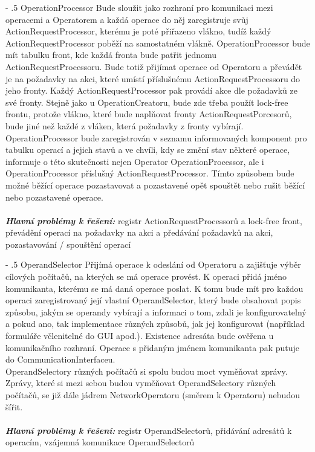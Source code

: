 \documentclass[12pt]{article}
\makeatletter
\newcommand\nodeop{OperationProcessor}
\newcommand\nodeos{OperandSelector}
\renewcommand\paragraph{%
    \@startsection{paragraph}{4}{0mm}%
       {-\baselineskip}%
       {.5\baselineskip}%
       {\normalfont\normalsize\bfseries}}
\makeatother
\begin{document}
\paragraph{\nodeop}
Bude sloužit jako rozhraní pro komunikaci mezi operacemi a Operatorem a každá operace do něj zaregistruje svůj ActionRequestProcessor, kterému je poté přiřazeno vlákno, tudíž každý ActionRequestProcessor poběží na samostatném vlákně. OperationProcessor bude mít tabulku front, kde každá fronta bude patřit jednomu ActionRequestProcessoru. Bude totiž přijímat operace od Operatoru a převádět je na požadavky na akci, které umístí příslušnému ActionRequestProcessoru do jeho fronty. Každý ActionRequestProcessor pak provádí akce dle požadavků ze své fronty. Stejně jako u OperationCreatoru, bude zde třeba použít lock-free frontu, protože vlákno, které bude naplňovat fronty ActionRequestPorcesorů, bude jiné než každé z vláken, která požadavky z fronty vybírají. OperationProcessor bude zaregistrován v seznamu informovaných komponent pro tabulku operací a jejich stavů a ve chvíli, kdy se změní stav některé operace, informuje o této skutečnosti nejen Operator OperationProcessor, ale i OperationProcessor příslušný ActionRequestProcessor. Tímto způsobem bude možné běžící operace pozastavovat a pozastavené opět spouštět nebo rušit běžící nebo pozastavené operace.\\\\
\textbf{\textit{Hlavní problémy k řešení:}} registr ActionRequestProcessorů a lock-free front, převádění operací na požadavky na akci a předávání požadavků na akci, pozastavování / spouštění operací

\paragraph{\nodeos} 
Přijímá operace k odeslání od Operatoru a zajišťuje výběr cílových počítačů, na kterých se má operace provést. K operaci přidá jméno komunikanta, kterému se má daná operace poslat. K tomu bude mít pro každou operaci zaregistrovaný její vlastní OperandSelector, který bude obsahovat popis způsobu, jakým se operandy vybírají a informaci o tom, zdali je konfigurovatelný a pokud ano, tak implementace různých způsobů, jak jej konfigurovat (například formuláře včlenitelné do GUI apod.). Existence adresáta bude ověřena u komunikačního rozhraní. Operace s přidaným jménem komunikanta pak putuje do CommunicationInterfaceu.\\ OperandSelectory různých počítačů si spolu budou moct vyměňovat zprávy. Zprávy, které si mezi sebou budou vyměňovat OperandSelectory různých počítačů, se již dále jádrem NetworkOperatoru (směrem k Operatoru) nebudou šířit.\\\\
\textbf{\textit{Hlavní problémy k řešení:}} registr OperandSelectorů, přidávání adresátů k operacím, vzájemná komunikace OperandSelectorů
\end{document}
